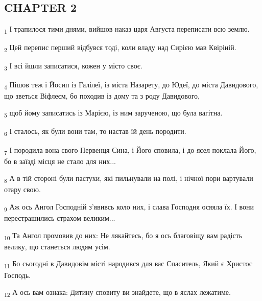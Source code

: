 \subsection{CHAPTER 2}
\begin{tcolorbox}
\textsubscript{1} І трапилося тими днями, вийшов наказ царя Августа переписати всю землю.
\end{tcolorbox}
\begin{tcolorbox}
\textsubscript{2} Цей перепис перший відбувся тоді, коли владу над Сирією мав Квіріній.
\end{tcolorbox}
\begin{tcolorbox}
\textsubscript{3} І всі йшли записатися, кожен у місто своє.
\end{tcolorbox}
\begin{tcolorbox}
\textsubscript{4} Пішов теж і Йосип із Галілеї, із міста Назарету, до Юдеї, до міста Давидового, що зветься Віфлеєм, бо походив із дому та з роду Давидового,
\end{tcolorbox}
\begin{tcolorbox}
\textsubscript{5} щоб йому записатись із Марією, із ним зарученою, що була вагітна.
\end{tcolorbox}
\begin{tcolorbox}
\textsubscript{6} І сталось, як були вони там, то настав їй день породити.
\end{tcolorbox}
\begin{tcolorbox}
\textsubscript{7} І породила вона свого Первенця Сина, і Його сповила, і до ясел поклала Його, бо в заїзді місця не стало для них...
\end{tcolorbox}
\begin{tcolorbox}
\textsubscript{8} А в тій стороні були пастухи, які пильнували на полі, і нічної пори вартували отару свою.
\end{tcolorbox}
\begin{tcolorbox}
\textsubscript{9} Аж ось Ангол Господній з'явивсь коло них, і слава Господня осяяла їх. І вони перестрашились страхом великим...
\end{tcolorbox}
\begin{tcolorbox}
\textsubscript{10} Та Ангол промовив до них: Не лякайтесь, бо я ось благовіщу вам радість велику, що станеться людям усім.
\end{tcolorbox}
\begin{tcolorbox}
\textsubscript{11} Бо сьогодні в Давидовім місті народився для вас Спаситель, Який є Христос Господь.
\end{tcolorbox}
\begin{tcolorbox}
\textsubscript{12} А ось вам ознака: Дитину сповиту ви знайдете, що в яслах лежатиме.
\end{tcolorbox}
